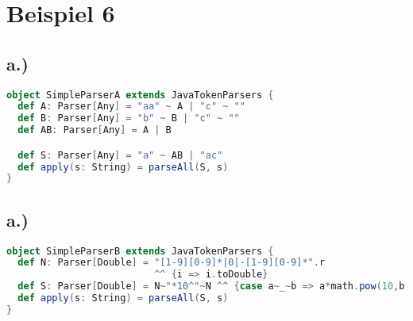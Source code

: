 \documentclass[12pt,runningheads,a4paper]{llncs}
\begin{document}
\newpage
\section*{Beispiel 6}
\subsection*{a.)}
\begin{lstlisting}[language=scala]
object SimpleParserA extends JavaTokenParsers {
  def A: Parser[Any] = "aa" ~ A | "c" ~ ""
  def B: Parser[Any] = "b" ~ B | "c" ~ ""
  def AB: Parser[Any] = A | B

  def S: Parser[Any] = "a" ~ AB | "ac"
  def apply(s: String) = parseAll(S, s)
}
\end{lstlisting}
\subsection*{a.)}
\begin{lstlisting}[language=scala]
object SimpleParserB extends JavaTokenParsers {
  def N: Parser[Double] = "[1-9][0-9]*|0|-[1-9][0-9]*".r 
                          ^^ {i => i.toDouble}
  def S: Parser[Double] = N~"*10^"~N ^^ {case a~_~b => a*math.pow(10,b)}
  def apply(s: String) = parseAll(S, s)
}
\end{lstlisting}
\end{document}

